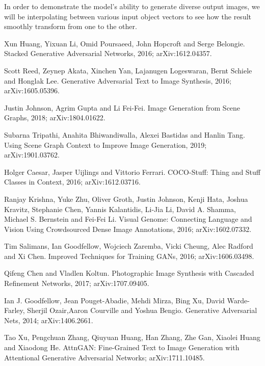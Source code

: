 \documentclass{article}
\begin{document}
In order to demonstrate the model's ability to generate diverse output images, we will be interpolating between various input object vectors to see how the result smoothly transform from one to the other.
\begin{thebibliography}{1}

\medskip
\small


Xun Huang, Yixuan Li, Omid Poursaeed, John Hopcroft and Serge Belongie.
\newblock Stacked Generative Adversarial Networks, 2016;
\newblock arXiv:1612.04357.

Scott Reed, Zeynep Akata, Xinchen Yan, Lajanugen Logeswaran, Bernt Schiele and Honglak Lee.
\newblock Generative Adversarial Text to Image Synthesis, 2016;
\newblock arXiv:1605.05396.

Justin Johnson, Agrim Gupta and Li Fei-Fei.
\newblock Image Generation from Scene Graphs, 2018;
\newblock arXiv:1804.01622.

Subarna Tripathi, Anahita Bhiwandiwalla, Alexei Bastidas and Hanlin Tang.
\newblock Using Scene Graph Context to Improve Image Generation, 2019;
\newblock arXiv:1901.03762.

Holger Caesar, Jasper Uijlings and Vittorio Ferrari.
\newblock COCO-Stuff: Thing and Stuff Classes in Context, 2016;
\newblock arXiv:1612.03716.

Ranjay Krishna, Yuke Zhu, Oliver Groth, Justin Johnson, Kenji Hata, Joshua Kravitz, Stephanie Chen, Yannis Kalantidis, Li-Jia Li, David A. Shamma, Michael S. Bernstein and Fei-Fei Li.
\newblock Visual Genome: Connecting Language and Vision Using Crowdsourced Dense Image Annotations, 2016;
\newblock arXiv:1602.07332.

Tim Salimans, Ian Goodfellow, Wojciech Zaremba, Vicki Cheung, Alec Radford and Xi Chen.
\newblock Improved Techniques for Training GANs, 2016;
\newblock arXiv:1606.03498.


Qifeng Chen and Vladlen Koltun.
\newblock Photographic Image Synthesis with Cascaded Refinement Networks, 2017;
\newblock arXiv:1707.09405.

Ian J. Goodfellow,
Jean Pouget-Abadie, Mehdi Mirza, Bing Xu, David Warde-Farley, Sherjil Ozair,Aaron Courville and Yoshua Bengio.
\newblock Generative Adversarial Nets, 2014;
\newblock arXiv:1406.2661.

Tao Xu, Pengchuan Zhang, Qiuyuan Huang,
Han Zhang, Zhe Gan, Xiaolei Huang and Xiaodong He.
\newblock AttnGAN: Fine-Grained Text to Image Generation with Attentional Generative Adversarial Networks;
\newblock arXiv:1711.10485.


\end{thebibliography}
\end{document}
